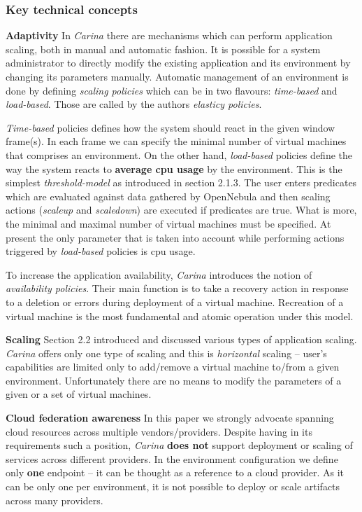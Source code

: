 \subsubsection{Key technical concepts}

\begin{asparaenum}
\item[\textbf{Adaptivity}]
In \emph{Carina} there are mechanisms which can perform application scaling, both in manual and automatic fashion. It is possible for a system administrator to directly modify the existing application and its environment by changing its parameters manually. Automatic management of an environment is done by defining \emph{scaling policies} which can be in two flavours: \emph{time-based} and \emph{load-based}. Those are called by the authors \emph{elasticy policies}.

\emph{Time-based} policies defines how the system should react in the given window frame(s). In each frame we can specify the minimal number of virtual machines that comprises an environment. On the other hand, \emph{load-based} policies define the way the system reacts to \textbf{average cpu usage} by the environment. This is the simplest \emph{threshold-model} as introduced in section 2.1.3. The user enters predicates which are evaluated against data gathered by OpenNebula and then scaling actions  (\emph{scaleup} and \emph{scaledown}) are executed if predicates are true. What is more, the minimal and maximal number of virtual machines must be specified. At present the only parameter that is taken into account while performing actions triggered by \emph{load-based} policies is cpu usage.

To increase the application availability, \emph{Carina} introduces the notion of \emph{availability policies}. Their main function is to take a recovery action in response to a deletion or errors during deployment of a virtual machine. Recreation of a virtual machine is the most fundamental and atomic operation under this model.

\item[\textbf{Scaling}]
Section 2.2 introduced and discussed various types of application scaling. \emph{Carina} offers only one type of scaling and this is \emph{horizontal} scaling -- user's capabilities are limited only to add/remove a virtual machine to/from a given environment. Unfortunately there are no means to modify the parameters of a given or a set of virtual machines.

\item[\textbf{Cloud federation awareness}]
In this paper we strongly advocate spanning cloud resources across multiple vendors/providers. Despite having in its requirements such a position, \emph{Carina} \textbf{does not} support deployment or scaling of services across different providers. In the environment configuration we define only \textbf{one} endpoint -- it can be thought as a reference to a cloud provider. As it can be only one per environment, it is not possible to deploy or scale artifacts across many providers.

\end{asparaenum}

